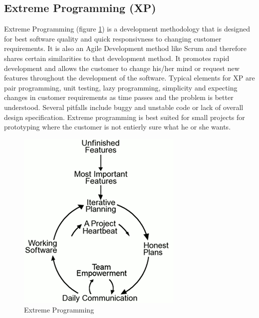 \subsection{Extreme Programming (XP)}
Extreme Programming (figure \ref{fig:designmodel-xp}) is a development methodology that is designed for
best software quality and quick responsivness to changing customer requirements. It is also an Agile Development
method like Scrum and therefore shares certain similarities to that development method. It promotes rapid
development and allows the customer to change his/her mind or request new features throughout
the development of the software. Typical elements for XP are pair programming, unit testing,
lazy programming, simplicity and expecting changes in customer requirements as time passes
and the problem is better understood. Several pitfalls include buggy and unstable code or lack of
overall design specification. Extreme programming is best suited for small projects for prototyping
where the customer is not entierly sure what he or she wants.
\begin{figure}[h!]
\centering \includegraphics[scale=0.75]{img/designmodel-xp}
\caption{Extreme Programming~\cite{link:xp}}
\label{fig:designmodel-xp}
\end{figure}

